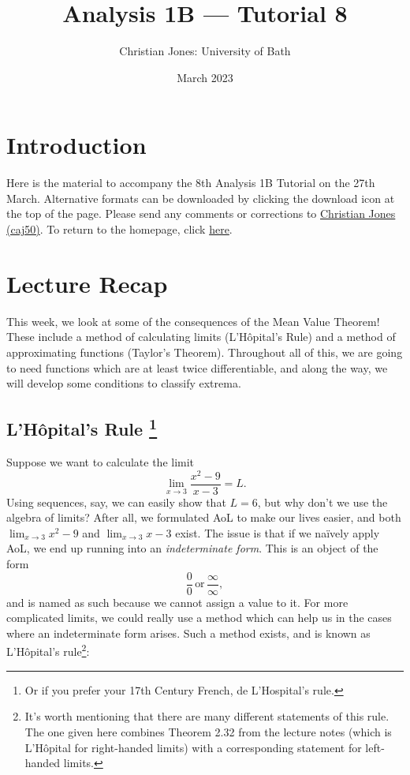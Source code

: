 \documentclass[
  17pt,
  a4paper]{extarticle}
\title{Analysis 1B --- Tutorial 8}
\author{Christian Jones: University of Bath}
\date{March 2023}
\theoremstyle{plain}
\theoremstyle{definition}
\theoremstyle{plain}
\theoremstyle{plain}
\theoremstyle{plain}
\theoremstyle{plain}
\theoremstyle{definition}
\theoremstyle{definition}
\theoremstyle{remark}
\theoremstyle{remark}
\renewcommand{\;}{\,}
\begin{document}
\maketitle

{
\setcounter{tocdepth}{2}
\tableofcontents
}
\newpage
{}

\hypertarget{introduction}{%
\section*{Introduction}\label{introduction}}

Here is the material to accompany the 8th Analysis 1B Tutorial on the 27th March. Alternative formats can be downloaded by clicking the download icon at the top of the page. Please send any comments or corrections to \href{mailto:caj50@bath.ac.uk}{Christian Jones (caj50)}. To return to the homepage, click \href{http://caj50.github.io/tutoring.html}{here}.

\hypertarget{lecture-recap}{%
\section{Lecture Recap}\label{lecture-recap}}

This week, we look at some of the consequences of the Mean Value Theorem! These include a method of calculating limits (L'Hôpital's Rule) and a method of approximating functions (Taylor's Theorem). Throughout all of this, we are going to need functions which are at least twice differentiable, and along the way, we will develop some conditions to classify extrema.

\hypertarget{lhuxf4pitals-rule-1}{%
\subsection[L'Hôpital's Rule ]{\texorpdfstring{L'Hôpital's Rule \footnote{Or if you prefer your 17th Century French, de L'Hospital's rule.}}{L'Hôpital's Rule }}\label{lhuxf4pitals-rule-1}}

Suppose we want to calculate the limit \[\lim_{x \to 3} \frac{x^2 - 9}{x - 3} = L.\] Using sequences, say, we can easily show that \(L = 6\), but why don't we use the algebra of limits? After all, we formulated AoL to make our lives easier, and both \(\lim_{x \to 3} x^2 - 9\) and \(\lim_{x \to 3} x - 3\) exist. The issue is that if we naïvely apply AoL, we end up running into an \emph{indeterminate form}. This is an object of the form \[\frac{0}{0} \; \text{or} \; \frac{\infty}{\infty},\] and is named as such because we cannot assign a value to it. For more complicated limits, we could really use a method which can help us in the cases where an indeterminate form arises. Such a method exists, and is known as L'Hôpital's rule\footnote{It's worth mentioning that there are many different statements of this rule. The one given here combines Theorem 2.32 from the lecture notes (which is L'Hôpital for right-handed limits) with a corresponding statement for left-handed limits.}:
\end{document}
